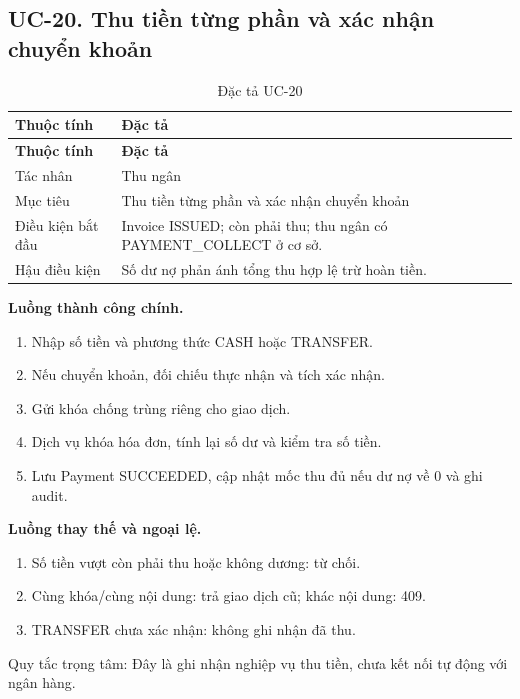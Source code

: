 \clearpage

\subsection{UC-20.\allowbreak{} Thu tiền từng phần và xác nhận chuyển khoản}
\label{uc:20}

{\small\setlength{\tabcolsep}{3pt}\renewcommand{\arraystretch}{1.12}
\begin{longtable}{@{}L{\textwidth-1.32pt\relax} L{\textwidth-4.68pt\relax}@{}}
\caption{Đặc tả UC-20}\\
\toprule
\textbf{Thuộc tính} & \textbf{Đặc tả}\\\midrule
\endfirsthead
\toprule
\textbf{Thuộc tính} & \textbf{Đặc tả}\\\midrule
\endhead
\bottomrule\endlastfoot
Tác nhân & Thu ngân\\[3pt]
Mục tiêu & Thu tiền từng phần và xác nhận chuyển khoản\\[3pt]
Điều kiện bắt đầu & Invoice ISSUED; còn phải thu; thu ngân có PAYMENT\_\allowbreak{}COLLECT ở cơ sở.\allowbreak{}\\[3pt]
Hậu điều kiện & Số dư nợ phản ánh tổng thu hợp lệ trừ hoàn tiền.\allowbreak{}\\[3pt]
\end{longtable}}
\noindent\textbf{Luồng thành công chính.}
\begin{enumerate}
\item Nhập số tiền và phương thức CASH hoặc TRANSFER.\allowbreak{}
\item Nếu chuyển khoản, đối chiếu thực nhận và tích xác nhận.\allowbreak{}
\item Gửi khóa chống trùng riêng cho giao dịch.\allowbreak{}
\item Dịch vụ khóa hóa đơn, tính lại số dư và kiểm tra số tiền.\allowbreak{}
\item Lưu Payment SUCCEEDED, cập nhật mốc thu đủ nếu dư nợ về 0 và ghi audit.\allowbreak{}
\end{enumerate}
\noindent\textbf{Luồng thay thế và ngoại lệ.}
\begin{enumerate}
\item Số tiền vượt còn phải thu hoặc không dương:\allowbreak{} từ chối.\allowbreak{}
\item Cùng khóa/\allowbreak{}cùng nội dung:\allowbreak{} trả giao dịch cũ; khác nội dung:\allowbreak{} 409.\allowbreak{}
\item TRANSFER chưa xác nhận:\allowbreak{} không ghi nhận đã thu.\allowbreak{}
\end{enumerate}
Quy tắc trọng tâm:\allowbreak{} Đây là ghi nhận nghiệp vụ thu tiền, chưa kết nối tự động với ngân hàng.\allowbreak{}

